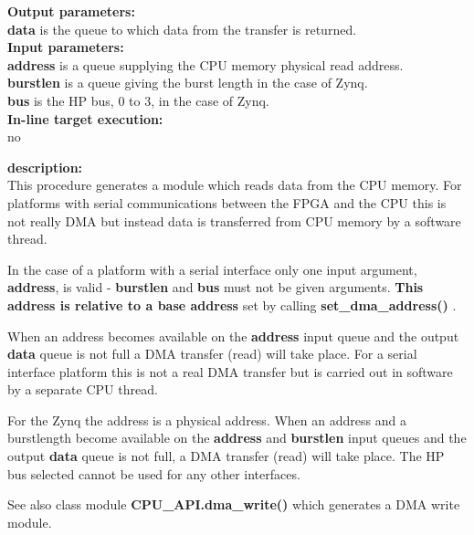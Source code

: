             {\bf Output parameters:} \\
            
            {\bf data} is the queue to which data from the transfer is returned.\\

            {\bf Input parameters:} \\
            {\bf address} is a queue supplying the CPU memory physical read address.\\
            {\bf burstlen} is a queue giving the burst length in the case of Zynq.\\
            {\bf bus} is the HP bus, 0 to 3, in the case of Zynq.\\
        
            {\bf In-line target execution:} \\
            no

            {\bf description:} \\
            This procedure generates a module which reads data from the CPU
            memory. For platforms with serial communications between the
            FPGA and the CPU this is not really DMA but instead data is transferred
            from CPU memory by a software thread.
            
            In the case of a platform with a serial interface only one input
            argument, {\bf address}, is valid - {\bf burstlen} and {\bf bus}
            must not be given arguments. {\bf This address is relative to a base
            address} set by calling {\bf set\_dma\_address()}
            .
            
            When an address becomes available on the {\bf address} input queue
            and the output {\bf data} queue is not full a DMA transfer (read)
            will take place. For a serial interface platform this is not a real
            DMA transfer but is carried out in software by a separate CPU
            thread.

            For the Zynq the address is a physical address. When an address and
            a burstlength become available on the {\bf address} and {\bf
            burstlen} input queues and the output {\bf data} queue is not full,
            a DMA transfer (read) will take place. The HP bus selected cannot be
            used for any other interfaces.

            See also class module {\bf CPU\_API.dma\_write()}
             which generates a DMA write module.



